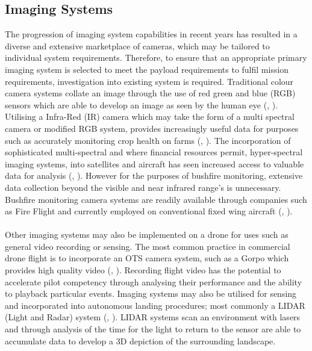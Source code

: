 
\subsection{Imaging Systems}

The progression of imaging system capabilities in recent years has resulted in a diverse and extensive marketplace of cameras, which may be tailored to individual system requirements. Therefore, to ensure that an appropriate primary imaging system is selected to meet the payload requirements to fulfil mission requirements, investigation into existing system is required. Traditional colour camera systems collate an image through the use of red green and blue (RGB) sensors which are able to develop an image as seen by the human eye (\citeauthor{Sam1}, \citeyear{Sam1}). Utilising a Infra-Red (IR) camera which may take the form of a multi spectral camera or modified RGB system, provides increasingly useful data for purposes such as accurately monitoring crop health on farms (\citeauthor{Sam1}, \citeyear{Sam1}). The incorporation of sophisticated multi-spectral and where financial resources permit, hyper-spectral imaging systems, into satellites and aircraft has seen  increased access to valuable data for analysis (\citeauthor{Sam2}, \citeyear{Sam2}). However for the purposes of bushfire monitoring, extensive data collection beyond the visible and near infrared range's is unnecessary. Bushfire monitoring camera systems are readily available through companies such as Fire Flight and currently employed on conventional fixed wing aircraft (\citeauthor{Sam6}, \citeyear{Sam6}). \\
\\
Other imaging systems may also be implemented on a drone for uses such as general video recording or sensing. The most common practice in commercial drone flight is to incorporate an OTS camera system, such as a Gorpo which provides high quality video (\citeauthor{Sam3}, \citeyear{Sam3}). Recording flight video has the potential to accelerate pilot competency through analysing their performance and the ability to playback particular events. Imaging systems may also be utilised for sensing and incorporated into autonomous landing procedures; most commonly a LIDAR (Light and Radar) system (\citeauthor{Sam4}, \citeyear{Sam4}). LIDAR systems scan an environment with lasers and through analysis of the time for the light to return to the sensor are able to accumulate data to develop a 3D depiction of the surrounding landscape.\\ %

